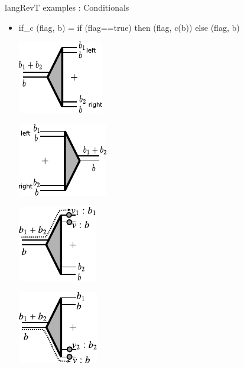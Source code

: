 \documentclass[svgnames,11pt]{beamer}
\begin{document}
\begin{frame}{ {{langRevT}} examples : Conditionals}
  
\begin{itemize}

\item
{{ if_c (flag, b) = if (flag==true) then (flag, c(b)) else (flag, b) }}

\pause
\vfill

\begin{multicols}{2}
\begin{center}
  \includegraphics{diagrams/thesis/dist.pdf}
\end{center}


\begin{center}
  \includegraphics{diagrams/thesis/factor.pdf}
\end{center}
  
\end{multicols}

\pause
\vfill

\begin{multicols}{2}
\begin{center}
  \includegraphics{diagrams/thesis/dist-wire-value1.pdf}
\end{center}


\begin{center}
  \includegraphics{diagrams/thesis/dist-wire-value2.pdf}
\end{center}
  

\end{multicols}
\end{itemize}
\end{frame}
\end{document}
